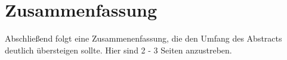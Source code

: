 \chapter{Zusammenfassung}
\label{cpt:Zusammenfassung}

Abschließend folgt eine Zusammenenfassung, die den Umfang des Abstracts deutlich übersteigen sollte. Hier sind 2 - 3 Seiten anzustreben.